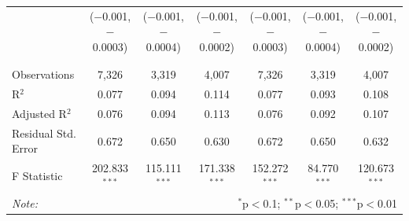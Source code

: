 \documentclass[alpha-refs]{wiley-article-01g}
\begin{document}
\begin{landscape}
\begin{table}[!htbp]
\begin{tabular}{@{\extracolsep{5pt}}lcccccc}
			& ($-$0.001, $-$0.0003) & ($-$0.001, $-$0.0004) & ($-$0.001, $-$0.0002) & ($-$0.001, $-$0.0003) & ($-$0.001, $-$0.0004) & ($-$0.001, $-$0.0002) \\ 
			& & & & & & \\ 
			\hline \\[-.8ex] 
			Observations & 7,326 & 3,319 & 4,007 & 7,326 & 3,319 & 4,007 \\ 
			R$^{2}$ & 0.077 & 0.094 & 0.114 & 0.077 & 0.093 & 0.108 \\ 
			Adjusted R$^{2}$ & 0.076 & 0.094 & 0.113 & 0.076 & 0.092 & 0.107 \\ 
			Residual Std. Error & 0.672 & 0.650 & 0.630 & 0.672 & 0.650 & 0.632 \\ 
			F Statistic & 202.833$^{***}$ & 115.111$^{***}$ & 171.338$^{***}$ & 152.272$^{***}$ & 84.770$^{***}$ & 120.673$^{***}$ \\ 
			\hline 
			\textit{Note:}  & \multicolumn{6}{r}{$^{*}$p$<$0.1; $^{**}$p$<$0.05; $^{***}$p$<$0.01} \\ 
		\end{tabular} 
	\end{table} 
	
\end{landscape}

\newpage
\end{document}
